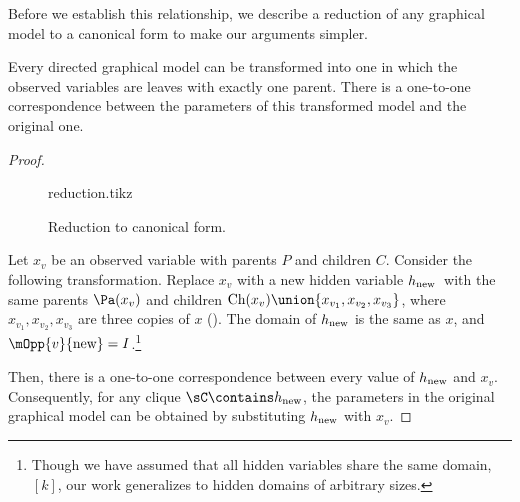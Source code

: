 
Before we establish this relationship,
we describe a reduction of any graphical model to
  a canonical form to make our arguments simpler.

\begin{lemma}
  \label{lem:reduction}
Every directed graphical model can be transformed into one in which
  the observed variables are leaves with exactly one parent. 
There is a one-to-one correspondence between the parameters of this
  transformed model and the original one.
\end{lemma}
\begin{proof}
  \begin{figure}
    \centering
    {reduction.tikz}
    \caption{Reduction to canonical form.}
    \label{fig:reduction}
  \end{figure}

  \providecommand{\hp}{\ensuremath{h_\text{\rm new}}}

  Let $x_v$ be an observed variable with parents $P$ and children $C$.
  Consider the following transformation.
  Replace $x_v$ with a new hidden variable \hp\ with the same
  parents $\Pa(x_v)$ and children $\text{Ch}(x_v) \union \{x_{v_1}, x_{v_2}, x_{v_3}\}$,
  where $x_{v_1},x_{v_2},x_{v_3}$ are three copies of $x$
  (). 
  The domain of $\hp$ is the same as $x$,
    and $\mOpp{v}{\textrm{new}} = I$.\footnote{Though we have assumed that all hidden variables share the
      same domain, $[k]$, our work generalizes to hidden domains of
      arbitrary sizes.
      }

  Then, there is a one-to-one correspondence between every value of
  $\hp$ and $x_v$. Consequently, for any clique $\sC \contains \hp$, the
  parameters in the original graphical model can be obtained by
  substituting $\hp$ with $x_v$.
\end{proof}

